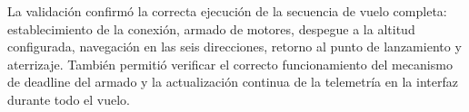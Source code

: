 La validación confirmó la correcta ejecución de la secuencia de vuelo completa: establecimiento de la conexión, armado de motores, despegue a la altitud configurada, navegación en las seis direcciones, retorno al punto de lanzamiento y aterrizaje. También permitió verificar el correcto funcionamiento del mecanismo de deadline del armado y la actualización continua de la telemetría en la interfaz durante todo el vuelo.
